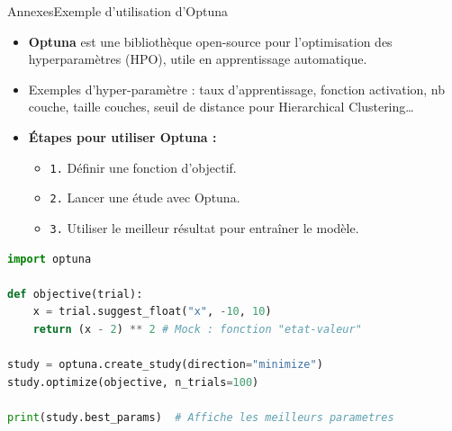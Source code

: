 \begin{frame}[fragile]{Annexes}{Exemple d'utilisation d'Optuna}
    \begin{itemize}
        \item \textbf{Optuna} est une bibliothèque open-source pour l'optimisation des hyperparamètres (HPO), utile en apprentissage automatique.
        \item Exemples d'hyper-paramètre : taux d'apprentissage, fonction activation, nb couche, taille couches, seuil de distance pour Hierarchical Clustering\dots
        \item \textbf{Étapes pour utiliser Optuna :}
        \begin{itemize}
            \item \texttt{1.} Définir une fonction d'objectif.
            \item \texttt{2.} Lancer une étude avec Optuna.
            \item \texttt{3.} Utiliser le meilleur résultat pour entraîner le modèle.
        \end{itemize}
    \end{itemize}

    \begin{lstlisting}[language=Python, basicstyle=\small\ttfamily, frame=single, caption=Exemple d'Optuna en Python]
import optuna

def objective(trial):
    x = trial.suggest_float("x", -10, 10)
    return (x - 2) ** 2 # Mock : fonction "etat-valeur"

study = optuna.create_study(direction="minimize")
study.optimize(objective, n_trials=100)

print(study.best_params)  # Affiche les meilleurs parametres
    \end{lstlisting}
\end{frame}


